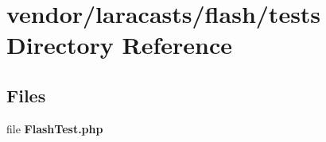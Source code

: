 \section{vendor/laracasts/flash/tests Directory Reference}
\label{dir_0bf2571a746fc036faec72a099eeb851}
\subsection*{Files}
\begin{DoxyCompactItemize}
\item 
file {\bf Flash\+Test.\+php}
\end{DoxyCompactItemize}
